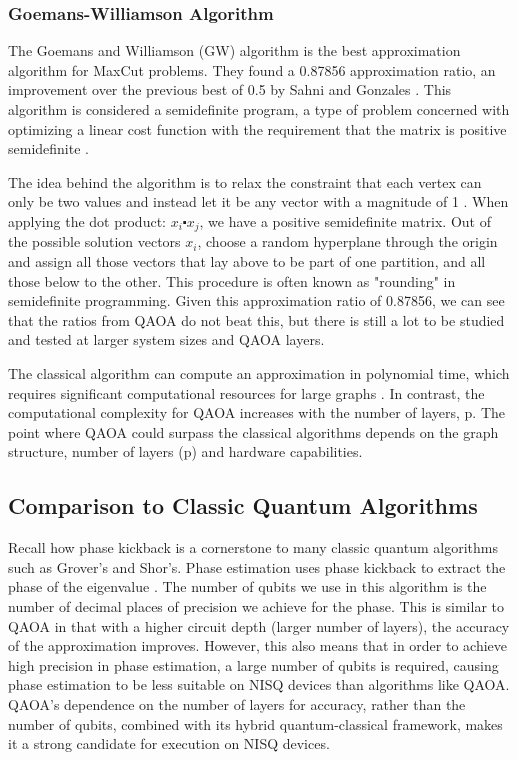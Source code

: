 \subsubsection{Goemans-Williamson Algorithm}
The Goemans and Williamson (GW) algorithm is the best approximation algorithm for MaxCut problems. They found a 0.87856 approximation ratio, an improvement over the previous best of 0.5 by Sahni and Gonzales \cite{GWalgorithm, 204569755}. This algorithm is considered a semidefinite program, a type of problem concerned with optimizing a linear cost function with the requirement that the matrix is positive semidefinite \cite{GWalgorithm}.

The idea behind the algorithm is to relax the constraint that each vertex can only be two values and instead let it be any vector with a magnitude of 1 \cite{GWalgorithm}. When applying the dot product: $x_i \centerdot x_j$, we have a positive semidefinite matrix. Out of the possible solution vectors $x_i$, choose a random hyperplane through the origin and assign all those vectors that lay above to be part of one partition, and all those below to the other. This procedure is often known as "rounding" in semidefinite programming. Given this approximation ratio of 0.87856, we can see that the ratios from QAOA do not beat this, but there is still a lot to be studied and tested at larger system sizes and QAOA layers. 

The classical algorithm can compute an approximation in polynomial time, which requires significant computational resources for large graphs \cite{GWalgorithm}. In contrast, the computational complexity for QAOA increases with the number of layers, p. The point where QAOA could surpass the classical algorithms depends on the graph structure, number of layers (p) and hardware capabilities.

\subsection{Comparison to Classic Quantum Algorithms}
Recall how phase kickback is a cornerstone to many classic quantum algorithms such as Grover's and Shor's. Phase estimation uses phase kickback to extract the phase of the eigenvalue \cite{classBook}. The number of qubits we use in this algorithm is the number of decimal places of precision we achieve for the phase. This is similar to QAOA in that with a higher circuit depth (larger number of layers), the accuracy of the approximation improves. However, this also means that in order to achieve high precision in phase estimation, a large number of qubits is required, causing phase estimation to be less suitable on NISQ devices than algorithms like QAOA. QAOA's dependence on the number of layers for accuracy, rather than the number of qubits, combined with its hybrid quantum-classical framework, makes it a strong candidate for execution on NISQ devices.

